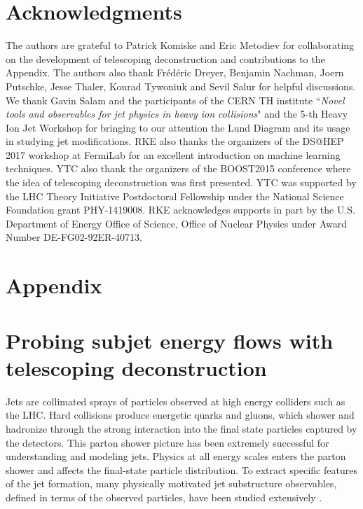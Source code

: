 \documentclass[notoc]{JHEP3}
\begin{document}
\section*{Acknowledgments}
The authors are grateful to Patrick Komiske and Eric Metodiev for collaborating on the development of telescoping deconstruction and contributions to the Appendix. The authors also thank Fr\'ed\'eric Dreyer, Benjamin Nachman, Joern Putschke, Jesse Thaler, Konrad Tywoniuk and Sevil Salur for helpful discussions. We thank Gavin Salam and the participants of the CERN TH institute ``{\sl Novel tools and observables for jet physics in heavy ion collisions}" and the 5-th Heavy Ion Jet Workshop for bringing to our attention the Lund Diagram and its usage in studying jet modifications. RKE also thanks the organizers of the DS@HEP 2017 workshop at FermiLab for an excellent introduction on machine learning techniques. YTC also thank the organizers of the BOOST2015 conference where the idea of telescoping deconstruction was first presented. YTC was supported by the LHC Theory Initiative Postdoctoral Fellowship under the National Science Foundation grant PHY-1419008. RKE acknowledges supports in part by the U.S. Department of Energy Office of Science, Office of Nuclear Physics under Award Number DE-FG02-92ER-40713.









\newpage
\appendix
\section*{Appendix}
\section{Probing subjet energy flows with telescoping deconstruction}

Jets are collimated sprays of particles observed at high energy colliders such as the LHC. Hard collisions produce energetic quarks and gluons, which shower and hadronize through the strong interaction into the final state particles captured by the detectors. This parton shower picture has been extremely successful for understanding and modeling jets. Physics at all energy scales enters the parton shower and affects the final-state particle distribution. To extract specific features of the jet formation, many physically motivated jet substructure observables, defined in terms of the observed particles, have been studied extensively \cite{Abdesselam:2010pt,Altheimer:2012mn,Altheimer:2013yza,Adams:2015hiv,Larkoski:2017jix,ATLAS-CONF-2017-064,Khachatryan:1955546}.
\end{document}
